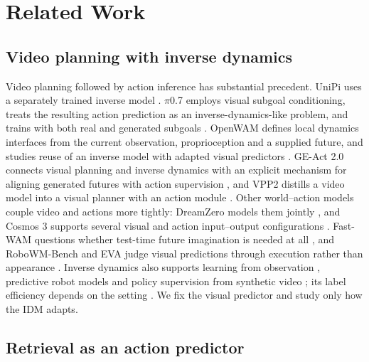 \documentclass[11pt,a4paper]{article}
\begin{document}
\section{Related Work}

\subsection{Video planning with inverse dynamics}

Video planning followed by action inference has substantial precedent. UniPi uses a separately trained inverse model \cite{ref1}. \ensuremath{\pi}0.7 employs visual subgoal conditioning, treats the resulting action prediction as an inverse-dynamics-like problem, and trains with both real and generated subgoals \cite{ref2}. OpenWAM defines local dynamics interfaces from the current observation, proprioception and a supplied future, and studies reuse of an inverse model with adapted visual predictors \cite{ref3}. GE-Act 2.0 connects visual planning and inverse dynamics with an explicit mechanism for aligning generated futures with action supervision \cite{ref4}, and VPP2 distills a video model into a visual planner with an action module \cite{ref5}. Other world--action models couple video and actions more tightly: DreamZero models them jointly \cite{ref19}, and Cosmos 3 supports several visual and action input--output configurations \cite{ref20}. Fast-WAM questions whether test-time future imagination is needed at all \cite{ref21}, and RoboWM-Bench and EVA judge visual predictions through execution rather than appearance \cite{ref22,ref23}. Inverse dynamics also supports learning from observation \cite{ref24}, predictive robot models \cite{ref25} and policy supervision from synthetic video \cite{ref26}; its label efficiency depends on the setting \cite{ref27}. We fix the visual predictor and study only how the IDM adapts.

\subsection{Retrieval as an action predictor}
\end{document}
